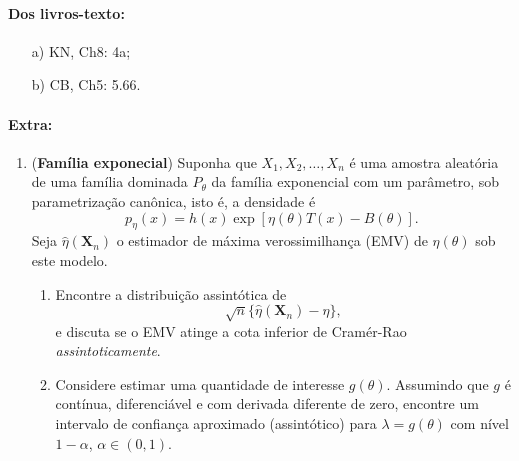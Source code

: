 \documentclass[a4paper,10pt, notitlepage]{report}
\newcommand{\rs}{X_1, X_2, \ldots, X_n} %
\newcommand{\bX}{\boldsymbol{X}} %
\begin{document}
\paragraph{Dos livros-texto:}

\begin{itemize}
    \item[a)] KN, Ch8: 4a;  
    \item[b)] CB, Ch5: 5.66. 
\end{itemize}

\paragraph{Extra:}

\begin{enumerate} 
\item (\textbf{Família exponecial}) Suponha que $\rs$ é uma amostra aleatória de uma família dominada $P_\theta$ da família exponencial com um parâmetro, sob parametrização canônica, isto é, a densidade é 
\begin{equation*}
    p_\eta(x) = h(x)\exp\left[\eta(\theta) T(x) - B(\theta)\right].
\end{equation*}
Seja $\hat{\eta}(\bX_n)$ o estimador de máxima verossimilhança  (EMV) de $\eta(\theta)$ sob este modelo.
\begin{enumerate}
    \item Encontre a distribuição assintótica de 
\begin{equation*}
    \sqrt{n}\{\hat{\eta}(\bX_n)-\eta\},
\end{equation*}
e discuta se o EMV atinge a cota inferior de Cramér-Rao \textit{assintoticamente}.
    \item  Considere estimar uma quantidade de interesse $g(\theta)$. 
    Assumindo que $g$ é contínua, diferenciável e com derivada diferente de zero, encontre um intervalo de confiança aproximado (assintótico) para $\lambda = g(\theta)$ com nível $1-\alpha$, $\alpha \in (0, 1)$.
\end{enumerate}


\end{enumerate}
\end{document}
